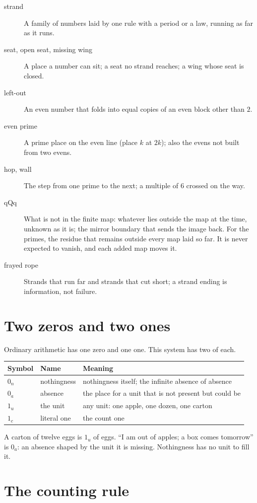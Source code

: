 \documentclass[11pt]{article}
\begin{document}
\begin{description}
\item[strand] A family of numbers laid by one rule with a period or a law, running as far as it runs.
\item[seat, open seat, missing wing] A place a number can sit; a seat no strand reaches; a wing whose seat is closed.
\item[left-out] An even number that folds into equal copies of an even block other than $2$.
\item[even prime] A prime place on the even line (place $k$ at $2k$); also the evens not built from two evens.
\item[hop, wall] The step from one prime to the next; a multiple of $6$ crossed on the way.
\item[qQq] What is not in the finite map: whatever lies outside the map at the time, unknown as it is; the mirror boundary that sends the image back. For the primes, the residue that remains outside every map laid so far. It is never expected to vanish, and each added map moves it.
\item[frayed rope] Strands that run far and strands that cut short; a strand ending is information, not failure.
\end{description}

\section{Two zeros and two ones}
Ordinary arithmetic has one zero and one one. This system has two of each.
\begin{center}\begin{tabular}{lll}\toprule
Symbol & Name & Meaning\\\midrule
$0_n$ & nothingness & nothingness itself; the infinite absence of absence\\
$0_a$ & absence & the place for a unit that is not present but could be\\
$1_u$ & the unit & any unit: one apple, one dozen, one carton\\
$1_c$ & literal one & the count one\\\bottomrule
\end{tabular}\end{center}
A carton of twelve eggs is $1_u$ of eggs. ``I am out of apples; a box comes tomorrow'' is $0_a$: an absence shaped by the unit it is missing. Nothingness has no unit to fill it.

\section{The counting rule}
\end{document}

